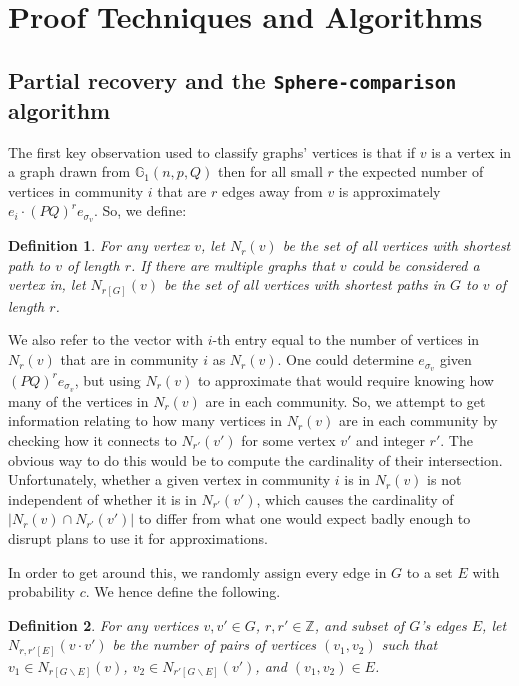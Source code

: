 \documentclass[11pt]{article}
\newcommand{\gss}{\mathbb{G}_1}
\newcommand{\1}{\mathbb{1}}
\newtheorem{definition}{Definition}
\begin{document}
\section{Proof Techniques and Algorithms}
\subsection{Partial recovery and the {\tt Sphere-comparison} algorithm}\label{pt1}
The first key observation used to classify graphs' vertices is that if $v$ is a vertex in a graph drawn from $\gss(n,p,Q)$ then for all small $r$ the expected number of vertices in community $i$ that are $r$ edges away from $v$ is approximately $e_i\cdot(PQ)^re_{\sigma_v}$. So, we define: 

\begin{definition}\label{def-n1}
For any vertex $v$, let $N_r(v)$ be the set of all vertices with shortest path to $v$ of length $r$. If there are multiple graphs that $v$ could be considered a vertex in, let $N_{r[G]}(v)$ be the set of all vertices with shortest paths in $G$ to $v$ of length $r$.
\end{definition}

We also refer to the vector with $i$-th entry equal to the number of vertices in $N_r(v)$ that are in community $i$ as $N_r(v)$. One could determine $e_{\sigma_v}$ given $(PQ)^re_{\sigma_v}$, but using $N_r(v)$ to approximate that would require knowing how many of the vertices in $N_r(v)$ are in each community. So, we attempt to get information relating to how many vertices in $N_r(v)$ are in each community by checking how it connects to $N_{r'}(v')$ for some vertex $v'$ and integer $r'$. The obvious way to do this would be to compute the cardinality of their intersection. Unfortunately, whether a given vertex in community $i$ is in $N_r(v)$ is not independent of whether it is in $N_{r'}(v')$, which causes the cardinality of $|N_r(v)\cap N_{r'}(v')|$ to differ from what one would expect badly enough to disrupt plans to use it for approximations.

In order to get around this, we randomly assign every edge in $G$ to a set $E$ with probability $c$. We hence define the following. 

\begin{definition}
For any vertices $v, v'\in G$, $r,r'\in \mathbb{Z}$, and subset of $G$'s edges $E$, let $N_{r,r'[E]}(v\cdot v')$ be the number of pairs of vertices $(v_1,v_2)$ such that $v_1\in N_{r[G\backslash E]}(v)$, $v_2\in N_{r'[G\backslash E]}(v')$, and $(v_1,v_2)\in E$.
\end{definition}
\end{document}
